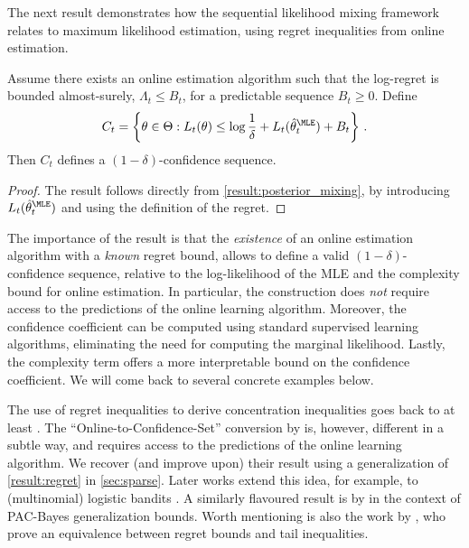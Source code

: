 The next result demonstrates how the sequential likelihood mixing framework relates to maximum likelihood estimation, using regret inequalities from online estimation. 
\begin{theorem}\label{result:regret}
    Assume there exists an online estimation algorithm such that the log-regret is bounded almost-surely, $\Lambda_t \leq B_t$, for a predictable sequence $B_t \geq 0$. Define 
    \begin{align*}
    C_t = \left\{ \theta \in \Theta: L_t(\theta) \leq  \log \frac{1}{\delta} + L_t(\hat \theta_t^\MLE) + B_t \right\} \,.
    \end{align*}
    Then $C_t$ defines a $(1-\delta)$-confidence sequence.
\end{theorem}
\begin{proof}
The result follows directly from \cref{result:posterior_mixing}, by introducing $L_t(\hat \theta_t^\MLE)$ and using the definition of the regret.
\end{proof}
The importance of the result is that the \emph{existence} of an online estimation algorithm with a \emph{known} regret bound, allows to define a valid $(1-\delta)$-confidence sequence, relative to the log-likelihood of the MLE and the complexity bound for online estimation. In particular, the construction does \emph{not} require access to the predictions of the online learning algorithm.  Moreover, the confidence coefficient can be computed using standard supervised learning algorithms, eliminating the need for computing the marginal likelihood. Lastly, the complexity term offers a more interpretable bound on the confidence coefficient. We will come back to several concrete examples below.


The use of regret inequalities to derive concentration inequalities goes back to at least \cite{dekel2010robust,abbasi2012online}. The ``Online-to-Confidence-Set'' conversion by \citet{abbasi2012online} is, however, different in a subtle way, and requires access to the predictions of the online learning algorithm. We recover (and improve upon) their result using a generalization of \cref{result:regret} in \cref{sec:sparse}. Later works extend this idea, for example, to (multinomial) logistic bandits \citep{lee2024improved}. A similarly flavoured result is by \cite{abeles2024generalization} in the context of PAC-Bayes generalization bounds. Worth mentioning is also the work by \cite{rakhlin2017equivalence}, who prove an equivalence between regret bounds and tail inequalities.

